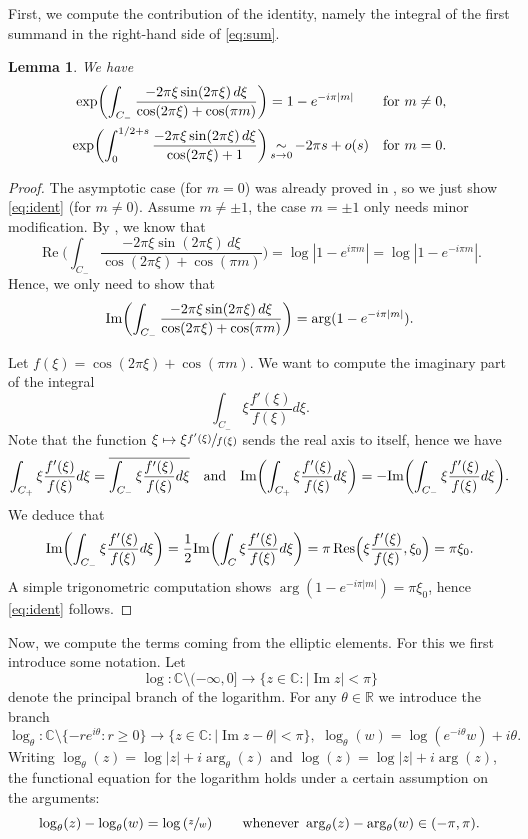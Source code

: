 \documentclass[10pt]{amsart}
\newcommand\mto{\mathchoice{\longmapsto}{\mapsto}{\mapsto}{\mapsto}}
\newcommand{\simm}{\mathop{\sim}\displaylimits}
\theoremstyle{plain}
\newtheorem{lem}[thm]{Lemma}
\theoremstyle{definition}
\theoremstyle{remark}
\newcommand{\R}{\mathbb{R}}
\newcommand{\C}{\mathbb{C}}
\renewcommand{\Im}{\textup{Im}}
\DeclareMathOperator{\IM}{Im}
\DeclareMathOperator{\RE}{Re}
\DeclareMathOperator{\Res}{Res}
\numberwithin{equation}{section}
\begin{document}
First, we compute the contribution of the identity, namely the integral of the first summand in the right-hand side of \cref{eq:sum}.
\begin{lem}
\label{lem1}
We have
\begin{align}
\label{eq:ident}
\exp \biggl(\int_{C_-} \frac{-2\pi\xi \sin(2\pi \xi)\,d\xi}{\cos(2\pi \xi) + \cos(\pi m)}\biggr) &= 1-e^{-i\pi|m|} &&\text{for } m \neq 0,\\
\exp\biggl( \int_0^{1/2+s} \frac{-2\pi\xi \sin(2\pi \xi)\,d\xi}{\cos(2\pi \xi) +1}\biggr) &\simm_{s \to 0} -2\pi s + o(s) && \text{for } m=0.\nonumber
\end{align}
\end{lem}
\begin{proof}
The asymptotic case (for $m=0$) was already proved in \cite[Lem.\,3]{fried1986fuchsian}, so we just show \cref{eq:ident} (for $m\neq 0$). Assume $m\neq\pm1$, the case $m=\pm1$ only needs minor modification.
By \cite[Lem.\,2]{fried1986fuchsian}, we know that
\[
\RE\biggl(\int_{C_-} \frac{-2\pi\xi \sin(2\pi \xi)\,d\xi}{\cos(2\pi \xi) + \cos(\pi m)}\biggr) = \log |1-e^{i\pi m}|=\log |1-e^{-i\pi m}|.
\]
Hence, we only need to show that
\[
\Im \biggl(\int_{C_-} \frac{-2\pi\xi \sin(2\pi \xi)\,d\xi}{\cos(2\pi \xi)+ \cos(\pi m)}\biggr) =
\arg(1-e^{-i\pi|m|}).
\]

Let $f(\xi) = \cos(2\pi \xi) + \cos(\pi m)$. We want to compute the imaginary part of the integral
\[
\int_{C_-} \xi \frac{f'(\xi)}{f(\xi)} d\xi.
\]
Note that the function $\xi \mto \xi \sfrac{f'(\xi)}{f(\xi)}$ sends the real axis to itself, hence we have
\[
\int_{C_+} \xi \frac{f'(\xi)}{f(\xi)} d\xi = \overline{\int_{C_-} \xi \frac{f'(\xi)}{f(\xi)} d\xi}\quad\text{and}\quad
\Im \biggl(\int_{C_+} \xi \frac{f'(\xi)}{f(\xi)} d\xi\biggr) = -\Im \biggl(\int_{C_-} \xi \frac{f'(\xi)}{f(\xi)} d\xi\biggr).
\]
We deduce that
\[
\Im \biggl(\int_{C_-} \xi \frac{f'(\xi)}{f(\xi)} d\xi\biggr) = \frac 1 2 \Im \biggl(\int_{C} \xi \frac{f'(\xi)}{f(\xi)} d\xi\biggr) = \pi \Res\Bigl(\xi \frac{f'(\xi)}{f(\xi)}, \xi_0\Bigr)= \pi \xi_0.
\]
A simple trigonometric computation shows
$\arg(1-e^{-i\pi|m|}) = \pi\xi_0$, hence \cref{eq:ident} follows.
\end{proof}

Now, we compute the terms coming from the elliptic elements. For this we first introduce some notation. Let
\[
\log:\C\setminus(-\infty,0]\to\{z\in\C:|\IM z|<\pi\}
\]
denote the principal branch of the logarithm. For any $\theta\in\R$ we introduce the branch
\[
\log\nolimits_\theta:\C\setminus\{-re^{i\theta}:r\geq0\}\to\{z\in\C:|\IM z-\theta|<\pi\}, \,\, \log\nolimits_\theta(w) = \log(e^{-i\theta}w)+i\theta.
\]
Writing $\log\nolimits_\theta(z)=\log|z|+i\arg_\theta(z)$ and $\log(z)=\log|z|+i\arg(z)$, the functional equation for the logarithm holds under a certain assumption on the arguments:
\begin{equation}\label{eq:FunctionalEqLog}
\log\nolimits_\theta(z)-\log\nolimits_\theta(w) = \log\left(\sfrac{z}{w}\right) \qquad \mbox{whenever }\arg_\theta(z)-\arg_\theta(w)\in(-\pi,\pi).
\end{equation}
\end{document}
